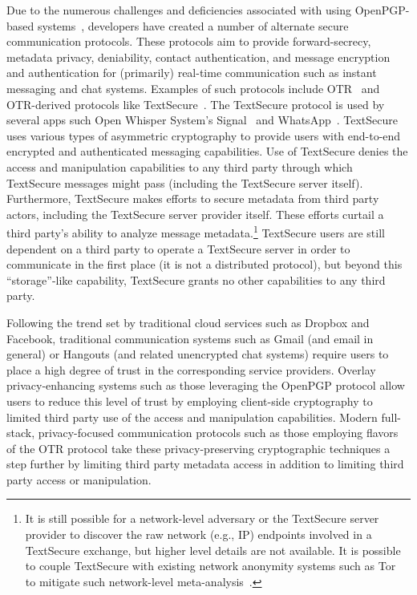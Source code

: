 Due to the numerous challenges and deficiencies associated with using
OpenPGP-based systems~\cite{borisov2004, green-pgp, whitten1999},
developers have created a number of alternate secure communication
protocols. These protocols aim to provide forward-secrecy, metadata
privacy, deniability, contact authentication, and message encryption
and authentication for (primarily) real-time communication such as
instant messaging and chat systems. Examples of such protocols include
OTR~\cite{otr-v3} and OTR-derived protocols like
TextSecure~\cite{otr-advanced-ratchet}. The TextSecure protocol is
used by several apps such Open Whisper System's
Signal~\cite{openwhisper} and WhatsApp~\cite{whatsapp}. TextSecure
uses various types of asymmetric cryptography to provide users with
end-to-end encrypted and authenticated messaging capabilities. Use of
TextSecure denies the access and manipulation capabilities to any
third party through which TextSecure messages might pass (including
the TextSecure server itself). Furthermore, TextSecure makes efforts
to secure metadata from third party actors, including the TextSecure
server provider itself. These efforts curtail a third party's ability
to analyze message metadata.\footnote{It is still possible for a
  network-level adversary or the TextSecure server provider to
  discover the raw network (e.g., IP) endpoints involved in a
  TextSecure exchange, but higher level details are not available. It
  is possible to couple TextSecure with existing network anonymity
  systems such as Tor~\cite{dingledine2004} to mitigate such
  network-level meta-analysis~\cite{intercept-chatting}.} TextSecure
users are still dependent on a third party to operate a TextSecure
server in order to communicate in the first place (it is not a
distributed protocol), but beyond this ``storage''-like capability,
TextSecure grants no other capabilities to any third party.

Following the trend set by traditional cloud services such as Dropbox
and Facebook, traditional communication systems such as Gmail (and
email in general) or Hangouts (and related unencrypted chat systems)
require users to place a high degree of trust in the corresponding
service providers. Overlay privacy-enhancing systems such as those
leveraging the OpenPGP protocol allow users to reduce this level of
trust by employing client-side cryptography to limited third party use
of the access and manipulation capabilities. Modern full-stack,
privacy-focused communication protocols such as those employing
flavors of the OTR protocol take these privacy-preserving
cryptographic techniques a step further by limiting third party
metadata access in addition to limiting third party access or
manipulation.

